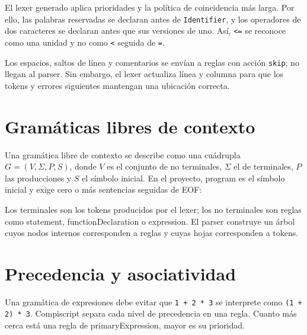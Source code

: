 \documentclass[12pt,letterpaper,oneside]{report}
\newcommand{\archivo}[1]{\texttt{#1}}
\newcommand{\regla}[1]{\textsf{#1}}
\begin{document}
El lexer generado aplica prioridades y la política de coincidencia más larga. Por
ello, las palabras reservadas se declaran antes de \archivo{Identifier}, y los
operadores de dos caracteres se declaran antes que sus versiones de uno. Así,
\archivo{<=} se reconoce como una unidad y no como \archivo{<} seguida de
\archivo{=}.

Los espacios, saltos de línea y comentarios se envían a reglas con acción
\archivo{skip}; no llegan al parser. Sin embargo, el lexer actualiza línea y columna
para que los tokens y errores siguientes mantengan una ubicación correcta.

\section{Gramáticas libres de contexto}

Una gramática libre de contexto se describe como una cuádrupla
$G=(V,\Sigma,P,S)$, donde $V$ es el conjunto de no terminales, $\Sigma$ el de
terminales, $P$ las producciones y $S$ el símbolo inicial. En el proyecto,
\regla{program} es el símbolo inicial y exige cero o más sentencias seguidas de EOF:

\begin{center}
\end{center}

Los terminales son los tokens producidos por el lexer; los no terminales son reglas
como \regla{statement}, \regla{functionDeclaration} o \regla{expression}. El parser
construye un árbol cuyos nodos internos corresponden a reglas y cuyas hojas
corresponden a tokens.

\section{Precedencia y asociatividad}

Una gramática de expresiones debe evitar que \archivo{1 + 2 * 3} se interprete como
\archivo{(1 + 2) * 3}. Compiscript separa cada nivel de precedencia en una regla.
Cuanto más cerca está una regla de \regla{primaryExpression}, mayor es su prioridad.
\end{document}
